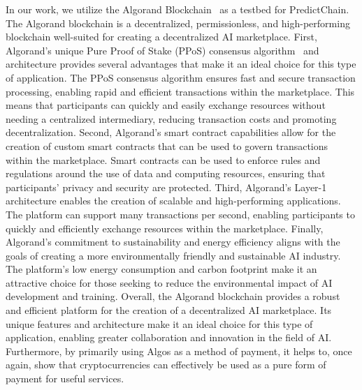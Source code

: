 \documentclass{ledger}
\begin{document}
In our work, we utilize the Algorand Blockchain~\cite{gilad2017algorand} as a testbed for PredictChain.
The Algorand blockchain is a decentralized, permissionless, and high-performing blockchain well-suited for creating a decentralized AI marketplace. First, Algorand's unique Pure Proof of Stake (PPoS) consensus algorithm~\cite{dimitri2022proof} and architecture provides several advantages that make it an ideal choice for this type of application. The PPoS consensus algorithm ensures fast and secure transaction processing, enabling rapid and efficient transactions within the marketplace. This means that participants can quickly and easily exchange resources without needing a centralized intermediary, reducing transaction costs and promoting decentralization.
Second, Algorand's smart contract capabilities allow for the creation of custom smart contracts that can be used to govern transactions within the marketplace. Smart contracts can be used to enforce rules and regulations around the use of data and computing resources, ensuring that participants' privacy and security are protected.
Third, Algorand's Layer-1 architecture enables the creation of scalable and high-performing applications. The platform can support many transactions per second, enabling participants to quickly and efficiently exchange resources within the marketplace.
Finally, Algorand's commitment to sustainability and energy efficiency aligns with the goals of creating a more environmentally friendly and sustainable AI industry. The platform's low energy consumption and carbon footprint make it an attractive choice for those seeking to reduce the environmental impact of AI development and training.
Overall, the Algorand blockchain provides a robust and efficient platform for the creation of a decentralized AI marketplace. Its unique features and architecture make it an ideal choice for this type of application, enabling greater collaboration and innovation in the field of AI.
Furthermore, by primarily using Algos as a method of payment, it helps to, once again, show that cryptocurrencies can effectively be used as a pure form of payment for useful services.


\end{document}

